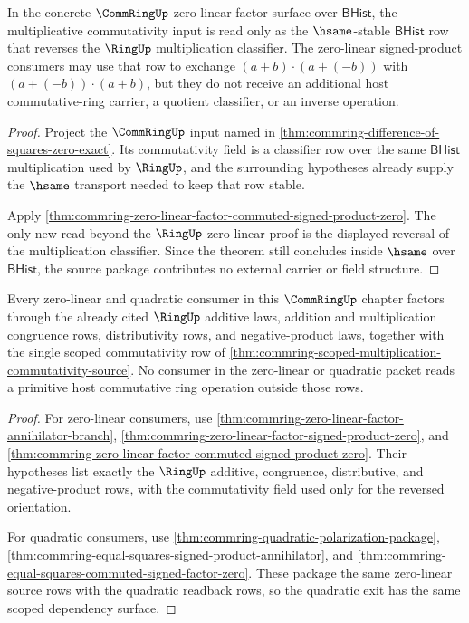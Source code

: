 \begin{theorem}
\label{thm:commring-scoped-multiplication-commutativity-source}
In the concrete $\CommRingUp$ zero-linear-factor surface over
$\mathsf{BHist}$, the multiplicative commutativity input is read only as the
$\hsame$-stable $\mathsf{BHist}$ row that reverses the $\RingUp$
multiplication classifier. The zero-linear signed-product consumers may use
that row to exchange $(a+b)\cdot(a+(-b))$ with $(a+(-b))\cdot(a+b)$, but they
do not receive an additional host commutative-ring carrier, a quotient
classifier, or an inverse operation.
\end{theorem}
\begin{proof}
Project the $\CommRingUp$ input named in
\autoref{thm:commring-difference-of-squares-zero-exact}. Its commutativity
field is a classifier row over the same $\mathsf{BHist}$ multiplication used by
$\RingUp$, and the surrounding hypotheses already supply the $\hsame$
transport needed to keep that row stable.

Apply
\autoref{thm:commring-zero-linear-factor-commuted-signed-product-zero}. The
only new read beyond the $\RingUp$ zero-linear proof is the displayed reversal
of the multiplication classifier. Since the theorem still concludes inside
$\hsame$ over $\mathsf{BHist}$, the source package contributes no external
carrier or field structure.
\end{proof}

\begin{theorem}
\label{thm:commring-scoped-ring-dependency-source}
Every zero-linear and quadratic consumer in this $\CommRingUp$ chapter factors
through the already cited $\RingUp$ additive laws, addition and multiplication
congruence rows, distributivity rows, and negative-product laws, together with
the single scoped commutativity row of
\autoref{thm:commring-scoped-multiplication-commutativity-source}. No consumer
in the zero-linear or quadratic packet reads a primitive host commutative ring
operation outside those rows.
\end{theorem}
\begin{proof}
For zero-linear consumers, use
\autoref{thm:commring-zero-linear-factor-annihilator-branch},
\autoref{thm:commring-zero-linear-factor-signed-product-zero}, and
\autoref{thm:commring-zero-linear-factor-commuted-signed-product-zero}. Their
hypotheses list exactly the $\RingUp$ additive, congruence, distributive, and
negative-product rows, with the commutativity field used only for the reversed
orientation.

For quadratic consumers, use
\autoref{thm:commring-quadratic-polarization-package},
\autoref{thm:commring-equal-squares-signed-product-annihilator}, and
\autoref{thm:commring-equal-squares-commuted-signed-factor-zero}. These
package the same zero-linear source rows with the quadratic readback rows, so
the quadratic exit has the same scoped dependency surface.
\end{proof}

